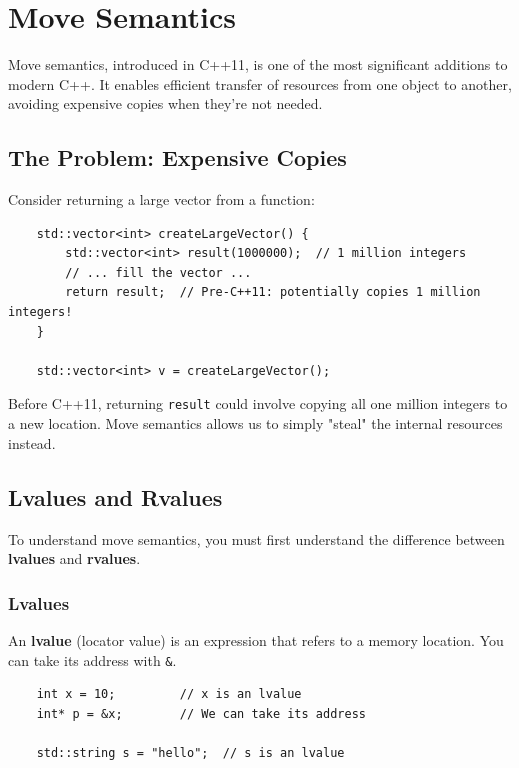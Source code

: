 \section{Move Semantics}

Move semantics, introduced in C++11, is one of the most significant additions to modern C++. It enables efficient transfer of resources from one object to another, avoiding expensive copies when they're not needed.

\subsection{The Problem: Expensive Copies}

Consider returning a large vector from a function:

\begin{lstlisting}
	std::vector<int> createLargeVector() {
		std::vector<int> result(1000000);  // 1 million integers
		// ... fill the vector ...
		return result;  // Pre-C++11: potentially copies 1 million integers!
	}
	
	std::vector<int> v = createLargeVector();
\end{lstlisting}

Before C++11, returning \texttt{result} could involve copying all one million integers to a new location. Move semantics allows us to simply "steal" the internal resources instead.

\subsection{Lvalues and Rvalues}

To understand move semantics, you must first understand the difference between \textbf{lvalues} and \textbf{rvalues}.

\subsubsection{Lvalues}

An \textbf{lvalue} (locator value) is an expression that refers to a memory location. You can take its address with \texttt{\&}.

\begin{lstlisting}
	int x = 10;         // x is an lvalue
	int* p = &x;        // We can take its address
	
	std::string s = "hello";  // s is an lvalue
\end{lstlisting}

